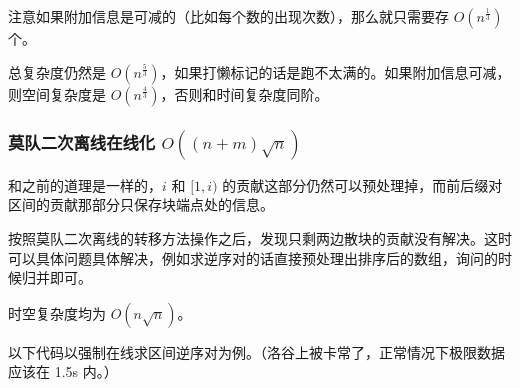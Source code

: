注意如果附加信息是可减的（比如每个数的出现次数），那么就只需要存 $O(n^{\frac 1 3})$ 个。

总复杂度仍然是 $O(n^{\frac 5 3})$，如果打懒标记的话是跑不太满的。如果附加信息可减，则空间复杂度是 $O(n^{\frac 4 3})$，否则和时间复杂度同阶。

\subsubsection{莫队二次离线在线化 $O((n + m)\sqrt n)$}

和之前的道理是一样的，$i$ 和 $[1, i)$ 的贡献这部分仍然可以预处理掉，而前后缀对区间的贡献那部分只保存块端点处的信息。

按照莫队二次离线的转移方法操作之后，发现只剩两边散块的贡献没有解决。这时可以具体问题具体解决，例如求逆序对的话直接预处理出排序后的数组，询问的时候归并即可。

时空复杂度均为 $O(n\sqrt n)$。

以下代码以强制在线求区间逆序对为例。（洛谷上被卡常了，正常情况下极限数据应该在 1.5s 内。）

\inputminted{cpp}{../src/datastructure/莫队二次离线在线化.cpp}
